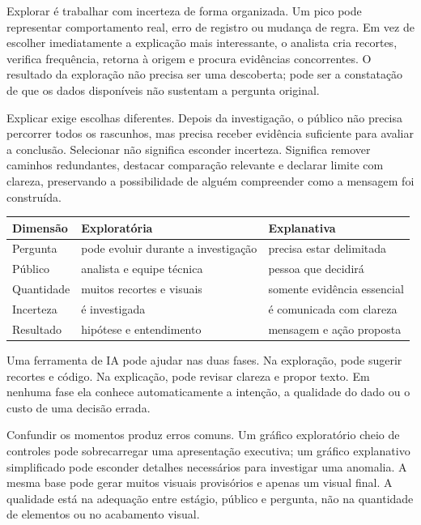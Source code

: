 Explorar é trabalhar com incerteza de forma organizada. Um pico pode representar comportamento real, erro de registro ou mudança de regra. Em vez de escolher imediatamente a explicação mais interessante, o analista cria recortes, verifica frequência, retorna à origem e procura evidências concorrentes. O resultado da exploração não precisa ser uma descoberta; pode ser a constatação de que os dados disponíveis não sustentam a pergunta original.

Explicar exige escolhas diferentes. Depois da investigação, o público não precisa percorrer todos os rascunhos, mas precisa receber evidência suficiente para avaliar a conclusão. Selecionar não significa esconder incerteza. Significa remover caminhos redundantes, destacar comparação relevante e declarar limite com clareza, preservando a possibilidade de alguém compreender como a mensagem foi construída.

\begin{center}
\begin{tabularx}{\textwidth}{@{}p{3cm}YY@{}}
\toprule
\textbf{Dimensão} & \textbf{Exploratória} & \textbf{Explanativa} \\
\midrule
Pergunta & pode evoluir durante a investigação & precisa estar delimitada \\
Público & analista e equipe técnica & pessoa que decidirá \\
Quantidade & muitos recortes e visuais & somente evidência essencial \\
Incerteza & é investigada & é comunicada com clareza \\
Resultado & hipótese e entendimento & mensagem e ação proposta \\
\bottomrule
\end{tabularx}
\end{center}

Uma ferramenta de IA pode ajudar nas duas fases. Na exploração, pode sugerir recortes e código. Na explicação, pode revisar clareza e propor texto. Em nenhuma fase ela conhece automaticamente a intenção, a qualidade do dado ou o custo de uma decisão errada.

Confundir os momentos produz erros comuns. Um gráfico exploratório cheio de controles pode sobrecarregar uma apresentação executiva; um gráfico explanativo simplificado pode esconder detalhes necessários para investigar uma anomalia. A mesma base pode gerar muitos visuais provisórios e apenas um visual final. A qualidade está na adequação entre estágio, público e pergunta, não na quantidade de elementos ou no acabamento visual.

